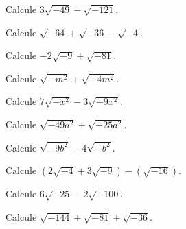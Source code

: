 \begin{ejercicio}
Calcule $\displaystyle 3\sqrt{-49}-\sqrt{-121}$.
\end{ejercicio}

\begin{ejercicio}
Calcule $\displaystyle \sqrt{-64}+\sqrt{-36}-\sqrt{-4}$.
\end{ejercicio}

\begin{ejercicio}
Calcule $\displaystyle -2\sqrt{-9}+\sqrt{-81}$.
\end{ejercicio}

\begin{ejercicio}
Calcule $\displaystyle \sqrt{-m^2}+\sqrt{-4m^2}$.
\end{ejercicio}

\begin{ejercicio}
Calcule $\displaystyle 7\sqrt{-x^2}-3\sqrt{-9x^2}$.
\end{ejercicio}

\begin{ejercicio}
Calcule $\displaystyle \sqrt{-49a^2}+\sqrt{-25a^2}$.
\end{ejercicio}

\begin{ejercicio}
Calcule $\displaystyle \sqrt{-9b^2}-4\sqrt{-b^2}$.
\end{ejercicio}

\begin{ejercicio}
Calcule $\displaystyle (2\sqrt{-4}+3\sqrt{-9})-(\sqrt{-16})$.
\end{ejercicio}

\begin{ejercicio}
Calcule $\displaystyle 6\sqrt{-25}-2\sqrt{-100}$.
\end{ejercicio}

\begin{ejercicio}
Calcule $\displaystyle \sqrt{-144}+\sqrt{-81}+\sqrt{-36}$.
\end{ejercicio}

